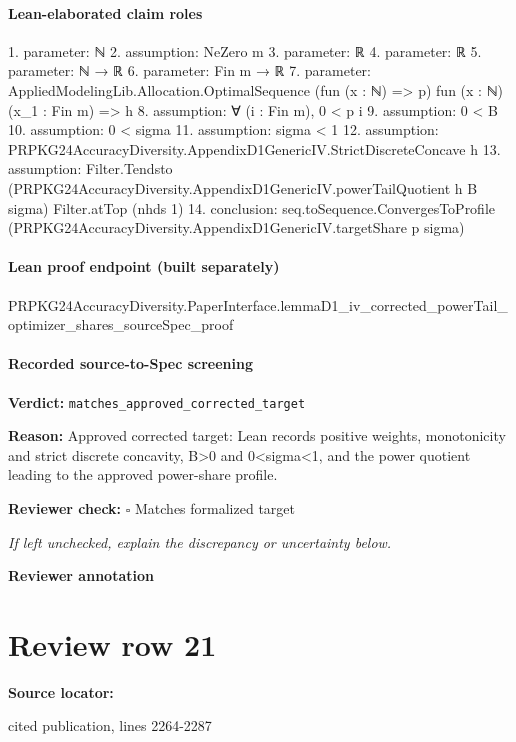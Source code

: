 \documentclass[10pt]{article}
\newcommand{\reviewerbox}{%
  \par\noindent\fbox{\parbox{0.96\linewidth}{\rule{0pt}{0.38in}}}\par
}
\newcommand{\reviewmatch}[1]{%
  \par\noindent\textbf{Reviewer check:} $\square$\; #1\par
  \noindent\emph{If left unchecked, explain the discrepancy or uncertainty below.}\par
}
\begin{document}
\paragraph{Lean-elaborated claim roles}\begin{ReviewVerbatim}
1. parameter: ℕ
2. assumption: NeZero m
3. parameter: ℝ
4. parameter: ℝ
5. parameter: ℕ → ℝ
6. parameter: Fin m → ℝ
7. parameter: AppliedModelingLib.Allocation.OptimalSequence (fun (x : ℕ) => p) fun (x : ℕ) (x_1 : Fin m) => h
8. assumption: ∀ (i : Fin m), 0 < p i
9. assumption: 0 < B
10. assumption: 0 < sigma
11. assumption: sigma < 1
12. assumption: PRPKG24AccuracyDiversity.AppendixD1GenericIV.StrictDiscreteConcave h
13. assumption: Filter.Tendsto (PRPKG24AccuracyDiversity.AppendixD1GenericIV.powerTailQuotient h B sigma) Filter.atTop (nhds 1)
14. conclusion: seq.toSequence.ConvergesToProfile (PRPKG24AccuracyDiversity.AppendixD1GenericIV.targetShare p sigma)
\end{ReviewVerbatim}

\paragraph{Lean proof endpoint (built separately)}\begin{ReviewVerbatim}
PRPKG24AccuracyDiversity.PaperInterface.lemmaD1_iv_corrected_powerTail_optimizer_shares_sourceSpec_proof
\end{ReviewVerbatim}

\paragraph{Recorded source-to-Spec screening}
\textbf{Verdict:} \texttt{matches\_approved\_corrected\_target}
\\
{\raggedright
\textbf{Reason:} Approved corrected target:\allowbreak{} Lean records positive weights, monotonicity and strict discrete concavity, B>0 and 0<sigma<1, and the power quotient leading to the approved power-\allowbreak{}share profile.\allowbreak{}
\par}
\reviewmatch{Matches formalized target}
\noindent\textbf{Reviewer annotation}\par
\reviewerbox
\clearpage
\hypertarget{source-claim-7237c50e8bcf2059}{}
\section*{Review row 21}
\textbf{Source locator:} {\footnotesize\raggedright cited publication, lines 2264-\allowbreak{}2287\par}
\end{document}
